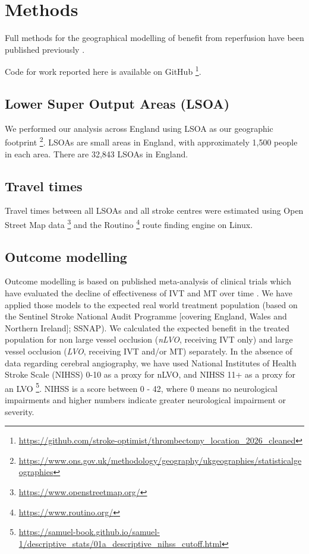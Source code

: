 \section{Methods}

Full methods for the geographical modelling of benefit from reperfusion have been published previously \cite{laws2025modelling}.

Code for work reported here is available on GitHub \footnote{\url{https://github.com/stroke-optimist/thrombectomy_location_2026_cleaned}}.

\subsection{Lower Super Output Areas (LSOA)}

We performed our analysis across England using LSOA as our geographic footprint \footnote{\url{https://www.ons.gov.uk/methodology/geography/ukgeographies/statisticalgeographies}}. LSOAs are small areas in England, with approximately 1,500 people in each area. There are 32,843 LSOAs in England.

\subsection{Travel times}

Travel times between all LSOAs and all stroke centres were estimated using Open Street Map data \footnote{\url{https://www.openstreetmap.org/}} and the Routino \footnote{\url{https://www.routino.org/}} route finding engine on Linux.

\subsection{Outcome modelling}

Outcome modelling is based on published meta-analysis of clinical trials which have evaluated the decline of effectiveness  of IVT and MT over time \cite{emberson_effect_2014, fransen_time_2016}. We have applied those models to the expected real world treatment population (based on the Sentinel Stroke National Audit Programme [covering England, Wales and Northern Ireland]; SSNAP). We calculated the expected benefit in the treated population for non large vessel occlusion (\textit{nLVO}, receiving IVT only) and large vessel occlusion (\textit{LVO}, receiving IVT and/or MT) separately. In the absence of data regarding cerebral angiography, we have used National Institutes of Health Stroke Scale (NIHSS) 0-10 as a proxy for nLVO, and NIHSS 11+ as a proxy for an LVO \footnote{\url{https://samuel-book.github.io/samuel-1/descriptive_stats/01a_descriptive_nihss_cutoff.html}}. NIHSS is a score between 0 - 42, where 0 means no neurological impairments and higher numbers indicate greater neurological impairment or severity.

